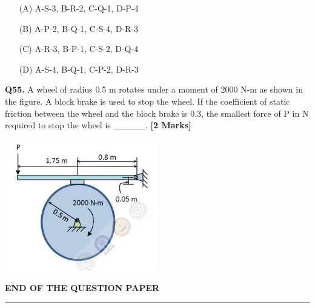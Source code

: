 \documentclass[11pt]{article}
\newcommand{\questionb}[2]{
    \noindent\textbf{Q#2.} #1 \hfill \textbf{[2 Marks]}
}
\begin{document}
\begin{enumerate}
    \item[(A)] A-S-3, B-R-2, C-Q-1, D-P-4  
    \item[(B)] A-P-2, B-Q-1, C-S-4, D-R-3  
    \item[(C)] A-R-3, B-P-1, C-S-2, D-Q-4  
    \item[(D)] A-S-4, B-Q-1, C-P-2, D-R-3  
\end{enumerate}
\vspace{0.5cm}

\questionb{A wheel of radius 0.5 m rotates under a moment of 2000 N-m as shown in the figure. A block brake is used to stop the wheel. If the coefficient of static friction between the wheel and the block brake is 0.3, the smallest force of P in N required to stop the wheel is \_\_\_\_\_.}{55}

\begin{center}
\includegraphics[width=0.5\textwidth]{figures/55.png}
\end{center}
\vspace{0.5cm}

\vspace{5cm}
\begin{center}
\textbf{END OF THE QUESTION PAPER} \\
\rule{\textwidth}{0.5pt}
\end{center}
\end{document}
